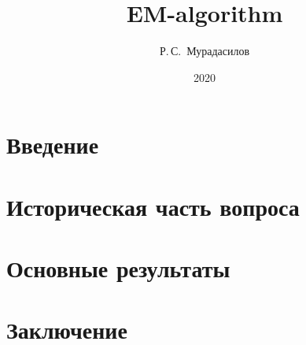 \documentclass[a4paper, 14pt]{extarticle}
\title{EM-algorithm}
\author{Р.\,С.~Мурадасилов}
\date{2020}
\theoremstyle{definition}
\begin{document}




\setcounter{page}{2}
\newpage

\tableofcontents
\newpage

\section{Введение}

\newpage

\section{Историческая часть вопроса}

\newpage

\section{Основные результаты}

\newpage

\section{Заключение}

\newpage


\end{document}
